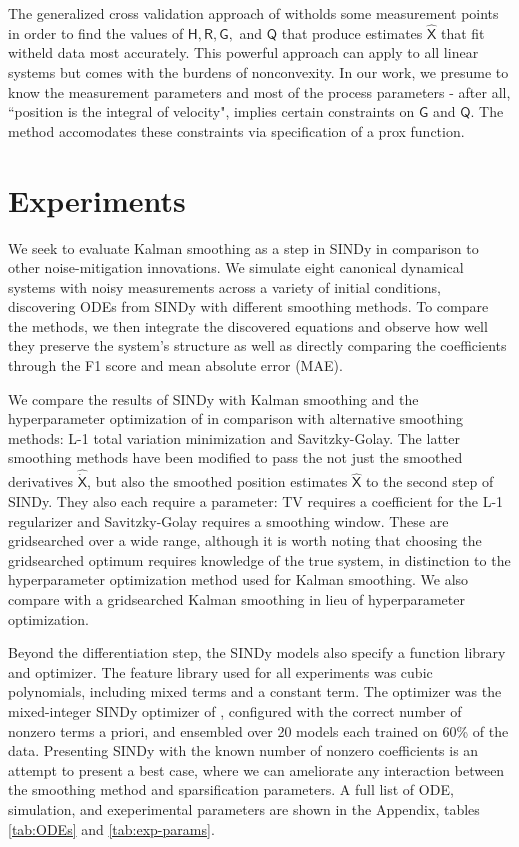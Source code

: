 \documentclass{ACCESS_latex_template_20231118/ieeeaccess}
\newcommand{\mat}[1]{\boldsymbol{\mathsf{#1}}}
\begin{document}
The generalized cross validation approach of \cite{Barratt2020} witholds some measurement points in order to find the values of $\mat H, \mat R, \mat G,$ and $\mat Q$ that produce estimates $\hat{\mat X}$ that fit witheld data most accurately.  This powerful approach can apply to all linear systems but comes with the burdens of nonconvexity.  In our work, we presume to know the measurement parameters and most of the process parameters - after all, ``position is the integral of velocity", implies certain constraints on $\mat G$ and $\mat Q$.  The method accomodates these constraints via specification of a prox function.

\section{Experiments}

We seek to evaluate Kalman smoothing as a step in SINDy in comparison to other noise-mitigation innovations.  We simulate eight canonical dynamical systems with noisy measurements across a variety of initial conditions, discovering ODEs from SINDy with different smoothing methods.  To compare the methods, we then integrate the discovered equations and observe how well they preserve the system's structure as well as directly comparing the coefficients through the F1 score and mean absolute error (MAE).

We compare the results of SINDy with Kalman smoothing and the hyperparameter optimization of \cite{Barratt2020} in comparison with alternative smoothing methods: L-1 total variation minimization and Savitzky-Golay.  The latter smoothing methods have been modified to pass the not just the smoothed derivatives $\mat{\widehat{\dot X}}$, but also the smoothed position estimates $\mat {\widehat X}$ to the second step of SINDy.  They also each require a parameter: TV requires a coefficient for the L-1 regularizer and Savitzky-Golay requires a smoothing window.  These are gridsearched over a wide range, although it is worth noting that choosing the gridsearched optimum requires knowledge of the true system, in distinction to the hyperparameter optimization method used for Kalman smoothing.
We also compare with a gridsearched Kalman smoothing in lieu of hyperparameter optimization.

Beyond the differentiation step, the SINDy models also specify a function library and optimizer.  The feature library used for all experiments was cubic polynomials, including mixed terms and a constant term.  The optimizer was the mixed-integer SINDy optimizer of \cite{Bertsimas2023}, configured with the correct number of nonzero terms a priori, and ensembled over 20 models each trained on 60\% of the data.  Presenting SINDy with the known number of nonzero coefficients is an attempt to present a best case, where we can ameliorate any interaction between the smoothing method and sparsification parameters.  A full list of ODE, simulation, and exeperimental parameters are shown in the Appendix, tables \ref{tab:ODEs} and \ref{tab:exp-params}.
\end{document}
